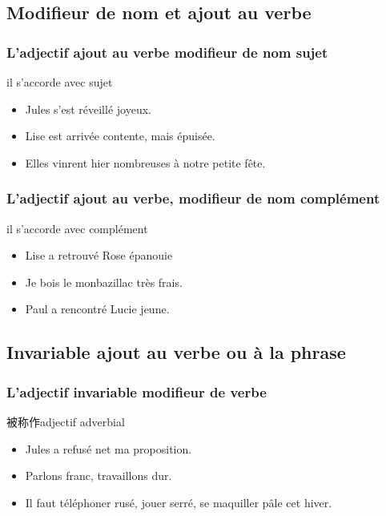 \documentclass[UTF8]{report}
\begin{document}
\subsection{Modifieur de nom et ajout au verbe}

\subsubsection{L’adjectif ajout au verbe modifieur de nom sujet}
il s’accorde avec sujet
\begin{itemize}
    \item Jules s’est réveillé joyeux.
    \item Lise est arrivée contente, mais épuisée.
    \item Elles vinrent hier nombreuses à notre petite fête.
\end{itemize}


\subsubsection{L’adjectif ajout au verbe, modifieur de nom complément}
il s’accorde avec complément 
\begin{itemize}
    \item Lise a retrouvé Rose épanouie
    \item Je bois le monbazillac très frais.
    \item Paul a rencontré Lucie jeune.
\end{itemize}

\subsection{Invariable ajout au verbe ou à la phrase}
\subsubsection{L’adjectif invariable modifieur de verbe}
被称作adjectif adverbial
\begin{itemize}
    \item Jules a refusé net ma proposition.
    \item Parlons franc, travaillons dur.
    \item Il faut téléphoner rusé, jouer serré, se maquiller pâle cet hiver.
\end{itemize}
\end{document}
